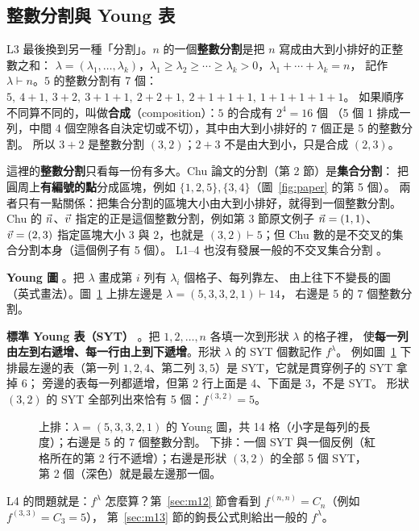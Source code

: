 \subsection{整數分割與 Young 表}\label{sec:m11}

L3 最後換到另一種「分割」。$n$ 的一個\textbf{整數分割}是把 $n$ 寫成由大到小排好的正整數之和：
$\lambda=(\lambda_1,\ldots,\lambda_k)$，$\lambda_1\ge\lambda_2\ge\cdots\ge\lambda_k>0$，$\lambda_1+\cdots+\lambda_k=n$，
記作 $\lambda\vdash n$。$5$ 的整數分割有 7 個：
$5,\ 4+1,\ 3+2,\ 3+1+1,\ 2+2+1,\ 2+1+1+1,\ 1+1+1+1+1$。
如果順序不同算不同的，叫做\textbf{合成}（composition）：$5$ 的合成有 $2^4=16$ 個
（5 個 1 排成一列，中間 4 個空隙各自決定切或不切），其中由大到小排好的 7 個正是 5 的整數分割。
所以 $3+2$ 是整數分割 $(3,2)$；$2+3$ 不是由大到小，只是合成 $(2,3)$。

\begin{notebox}[注意：兩種「分割」不是同一個東西]
\begin{minipage}[c]{0.67\linewidth}
這裡的\textbf{整數分割}只看每一份有多大。Chu 論文的分割（第 2 節）是\textbf{集合分割}：
把圓周上\textbf{有編號的點}分成區塊，例如 $\{1,2,5\},\{3,4\}$（圖~\ref{fig:paper} 的第 5 個）。
兩者只有一點關係：把集合分割的區塊大小由大到小排好，就得到一個整數分割。
Chu 的 $\vec n$、$\vec v$ 指定的正是這個整數分割，例如第 3 節原文例子 $\vec n=(1,1)$、$\vec v=(2,3)$
指定區塊大小 $3$ 與 $2$，也就是 $(3,2)\vdash 5$；但 Chu 數的是不交叉的集合分割本身（這個例子有 5 個）。
L1--4 也沒有發展一般的不交叉集合分割 。
\end{minipage}\hfill
\begin{minipage}[c]{0.31\linewidth}
\centering
\FigMelevenWarn
\end{minipage}
\end{notebox}

\textbf{Young 圖} 。把 $\lambda$ 畫成第 $i$ 列有 $\lambda_i$ 個格子、每列靠左、
由上往下不變長的圖（英式畫法）。圖~\ref{fig:m11-young} 上排左邊是 $\lambda=(5,3,3,2,1)\vdash 14$，
右邊是 5 的 7 個整數分割。

\textbf{標準 Young 表（SYT）} 。把 $1,2,\ldots,n$ 各填一次到形狀 $\lambda$ 的格子裡，
使\textbf{每一列由左到右遞增、每一行由上到下遞增}。形狀 $\lambda$ 的 SYT 個數記作 $f^\lambda$。
例如圖~\ref{fig:m11-young} 下排最左邊的表（第一列 $1,2,4$、第二列 $3,5$）是 SYT，它就是貫穿例子的 SYT 拿掉 6；
旁邊的表每一列都遞增，但第 2 行上面是 4、下面是 3，不是 SYT。
形狀 $(3,2)$ 的 SYT 全部列出來恰有 5 個：$f^{(3,2)}=5$。

\begin{figure}[H]
\centering
\FigMelevenYoungSYT
\caption{上排：$\lambda=(5,3,3,2,1)$ 的 Young 圖，共 14 格（小字是每列的長度）；右邊是 5 的 7 個整數分割。
下排：一個 SYT 與一個反例（\textcolor{cBad}{紅格}所在的第 2 行不遞增）；右邊是形狀 $(3,2)$ 的全部 5 個 SYT，
第 2 個（深色）就是最左邊那一個。}
\label{fig:m11-young}
\end{figure}

L4 的問題就是：$f^\lambda$ 怎麼算？第~\ref{sec:m12} 節會看到 $f^{(n,n)}=C_n$（例如 $f^{(3,3)}=C_3=5$），
第~\ref{sec:m13} 節的鉤長公式則給出一般的 $f^\lambda$。
